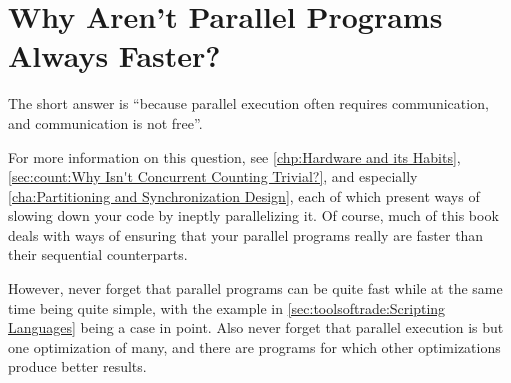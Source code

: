 
\section{Why Aren't Parallel Programs Always Faster?}
\label{sec:app:questions:Why Aren't Parallel Programs Always Faster?}

The short answer is ``because parallel execution often requires
communication, and communication is not free''.

For more information on this question, see
\cref{chp:Hardware and its Habits},
\cref{sec:count:Why Isn't Concurrent Counting Trivial?},
and especially
\cref{cha:Partitioning and Synchronization Design},
each of which present ways of slowing down your code by ineptly
parallelizing it.
Of course, much of this book deals with ways of ensuring that your
parallel programs really are faster than their sequential counterparts.

However, never forget that parallel programs can be quite fast while at
the same time being quite simple, with the example in
\cref{sec:toolsoftrade:Scripting Languages}
being a case in point.
Also never forget that parallel execution is but one optimization of many,
and there are programs for which other optimizations produce better results.
